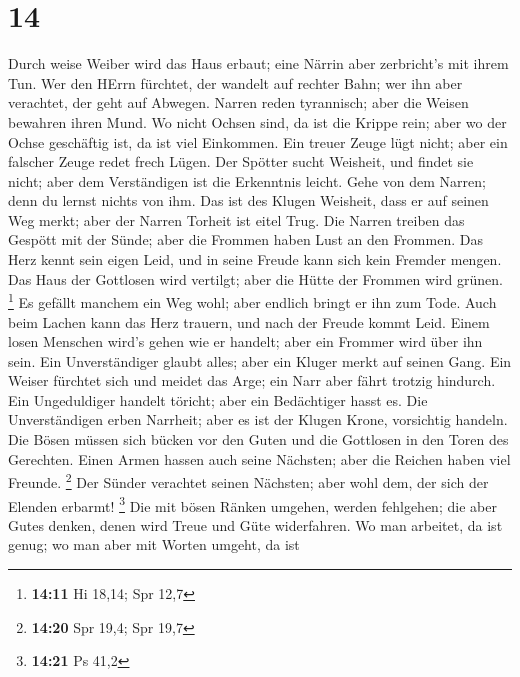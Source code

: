 \hypertarget{section-13}{%
\section{14}\label{section-13}}

 Durch weise Weiber wird das Haus erbaut; eine Närrin aber
zerbricht's mit ihrem Tun.  Wer den HErrn fürchtet, der
wandelt auf rechter Bahn; wer ihn aber verachtet, der geht auf Abwegen.
 Narren reden tyrannisch; aber die Weisen bewahren ihren
Mund.  Wo nicht Ochsen sind, da ist die Krippe rein; aber
wo der Ochse geschäftig ist, da ist viel Einkommen.  Ein
treuer Zeuge lügt nicht; aber ein falscher Zeuge redet frech Lügen.
 Der Spötter sucht Weisheit, und findet sie nicht; aber
dem Verständigen ist die Erkenntnis leicht.  Gehe von dem
Narren; denn du lernst nichts von ihm.  Das ist des Klugen
Weisheit, dass er auf seinen Weg merkt; aber der Narren Torheit ist
eitel Trug.  Die Narren treiben das Gespött mit der Sünde;
aber die Frommen haben Lust an den Frommen.  Das Herz
kennt sein eigen Leid, und in seine Freude kann sich kein Fremder
mengen.  Das Haus der Gottlosen wird vertilgt; aber die
Hütte der Frommen wird grünen. \footnote{\textbf{14:11} Hi 18,14; Spr
  12,7}  Es gefällt manchem ein Weg wohl; aber endlich
bringt er ihn zum Tode.  Auch beim Lachen kann das Herz
trauern, und nach der Freude kommt Leid.  Einem losen
Menschen wird's gehen wie er handelt; aber ein Frommer wird über ihn
sein.  Ein Unverständiger glaubt alles; aber ein Kluger
merkt auf seinen Gang.  Ein Weiser fürchtet sich und
meidet das Arge; ein Narr aber fährt trotzig hindurch. 
Ein Ungeduldiger handelt töricht; aber ein Bedächtiger hasst es.
 Die Unverständigen erben Narrheit; aber es ist der
Klugen Krone, vorsichtig handeln.  Die Bösen müssen sich
bücken vor den Guten und die Gottlosen in den Toren des Gerechten.
 Einen Armen hassen auch seine Nächsten; aber die Reichen
haben viel Freunde. \footnote{\textbf{14:20} Spr 19,4; Spr 19,7}
 Der Sünder verachtet seinen Nächsten; aber wohl dem, der
sich der Elenden erbarmt! \footnote{\textbf{14:21} Ps 41,2}
 Die mit bösen Ränken umgehen, werden fehlgehen; die aber
Gutes denken, denen wird Treue und Güte widerfahren.  Wo
man arbeitet, da ist genug; wo man aber mit Worten umgeht, da ist

